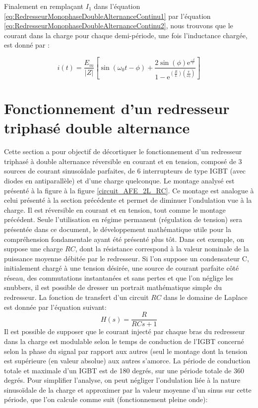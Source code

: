 Finalement en remplaçant $I_1$ dans l'équation \ref{eq:RedresseurMonophaseDoubleAlternanceContinu1} par l'équation \ref{eq:RedresseurMonophaseDoubleAlternanceContinu2}, nous trouvons que le courant dans la charge pour chaque demi-période, une fois l'inductance chargée, est donné par :

\begin{equation}
	i(t) = \frac{E_m}{|Z|}\left[\sin{(\omega_0 t - \phi)} + \frac{2\sin(\phi) \mbox{e}^{\frac{-t}{\tau}}}{1-\mbox{e}^{\left(\frac{R}{L}\right)\left(\frac{\pi}{\omega_0}\right)}} \right] 
\end{equation}

\section{Fonctionnement d'un redresseur triphasé double alternance}
Cette section a pour objectif de décortiquer le fonctionnement d'un redresseur triphasé à double alternance réversible en courant et en tension, composé de 3 sources de courant sinusoïdale parfaites, de 6 interrupteurs de type IGBT (avec diodes en antiparallèle) et d'une charge quelconque. Le montage analysé est présenté à la figure à la figure \ref{circuit_AFE_2L_RC}. Ce montage est analogue à celui présenté à la section précédente et permet de diminuer l'ondulation vue à la charge. Il est réversible en courant et en tension, tout comme le montage précédent. Seule l'utilisation en régime permanent (régulation de tension) sera présentée dans ce document, le développement mathématique utile pour la compréhension fondamentale ayant été présenté plus tôt. Dans cet exemple, on suppose une charge $RC$, dont la résistance correspond à la valeur nominale de la puissance moyenne débitée par le redresseur. Si l'on suppose un condensateur C, initialement chargé à une tension désirée, une source de courant parfaite côté réseau, des commutations instantanées et sans pertes et que l'on néglige les snubbers, il est possible de dresser un portrait mathématique simple du redresseur. La fonction de transfert d'un circuit $RC$ dans le domaine de Laplace est donnée par l'équation suivant:
\begin{equation}
H(s) = \frac{R}{RCs + 1}
\end{equation}
Il est possible de supposer que le courant injecté par chaque bras du redresseur dans la charge est modulable selon le temps de conduction de l'IGBT concerné selon la phase du signal par rapport aux autres (seul le montage dont la tension est supérieure (en valeur absolue) aux autres s'amorce. La période de conduction totale et maximale d'un IGBT est de 180 degrés, sur une période totale de 360 degrés. Pour simplifier l'analyse, on peut négliger l'ondulation liée à la nature sinusoïdale de la charge et approximer par la valeur moyenne d'un sinus sur cette période, que l'on calcule comme suit (fonctionnement pleine onde):
